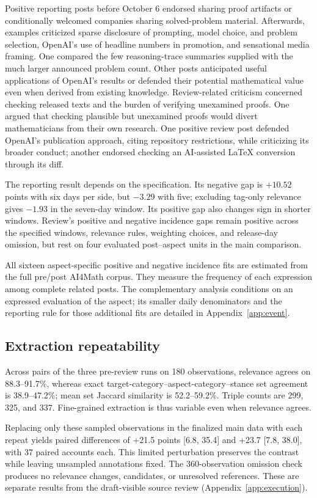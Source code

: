 \documentclass[sigconf,balance=false]{acmart}
\begin{document}
Positive reporting posts before October 6 endorsed sharing proof artifacts or conditionally welcomed companies sharing solved-problem material. Afterwards, examples criticized sparse disclosure of prompting, model choice, and problem selection, OpenAI's use of headline numbers in promotion, and sensational media framing. One compared the few reasoning-trace summaries supplied with the much larger announced problem count. Other posts anticipated useful applications of OpenAI's results or defended their potential mathematical value even when derived from existing knowledge. Review-related criticism concerned checking released texts and the burden of verifying unexamined proofs. One argued that checking plausible but unexamined proofs would divert mathematicians from their own research. One positive review post defended OpenAI's publication approach, citing repository restrictions, while criticizing its broader conduct; another endorsed checking an AI-assisted LaTeX conversion through its diff.

The reporting result depends on the specification. Its negative gap is $+10.52$ points with six days per side, but $-3.29$ with five; excluding tag-only relevance gives $-1.93$ in the seven-day window. Its positive gap also changes sign in shorter windows. Review's positive and negative incidence gaps remain positive across the specified windows, relevance rules, weighting choices, and release-day omission, but rest on four evaluated post--aspect units in the main comparison.

All sixteen aspect-specific positive and negative incidence fits are estimated from the full pre/post AI4Math corpus. They measure the frequency of each expression among complete related posts. The complementary analysis conditions on an expressed evaluation of the aspect; its smaller daily denominators and the reporting rule for those additional fits are detailed in Appendix~\ref{app:event}.

\subsection{Extraction repeatability}
Across pairs of the three pre-review runs on 180 observations, relevance agrees on 88.3--91.7\%, whereas exact target-category--aspect-category--stance set agreement is 38.9--47.2\%; mean set Jaccard similarity is 52.2--59.2\%. Triple counts are 299, 325, and 337. Fine-grained extraction is thus variable even when relevance agrees.

Replacing only these sampled observations in the finalized main data with each repeat yields paired differences of +21.5 points [6.8, 35.4] and +23.7 [7.8, 38.0], with 37 paired accounts each. This limited perturbation preserves the contrast while leaving unsampled annotations fixed. The 360-observation omission check produces no relevance changes, candidates, or unresolved references. These are separate results from the draft-visible source review (Appendix~\ref{app:execution}).
\end{document}
